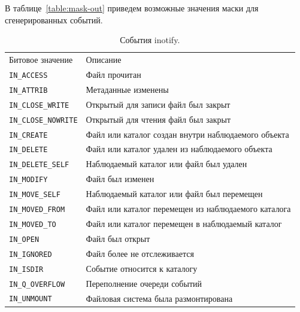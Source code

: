 \documentclass[14pt, russian]{scrartcl}
\newcommand{\code}[1]{\texttt{#1}}
\begin{document}
В таблице~\ref{table:mask-out} приведем возможные значения маски для
сгенерированных событий.

\begin{table}[htb]
  \caption{\centering События inotify.}
  \small
  \centering\begin{tabular}{|l|l|}
              \hline\hline
              \multirow{ 2}{*}{Битовое значение} & \multirow{ 2}{*}{Описание}\\
                                                 & \\
              \hline
              \code{IN\_ACCESS} & Файл прочитан\\
              \hline
              \code{IN\_ATTRIB} & Метаданные изменены\\
              \hline
              \code{IN\_CLOSE\_WRITE} & Открытый для записи файл был закрыт \\
              \hline
              \code{IN\_CLOSE\_NOWRITE} & Открытый для чтения файл был закрыт \\
              \hline
              \code{IN\_CREATE} & Файл или каталог создан внутри наблюдаемого объекта \\
              \hline
              \code{IN\_DELETE} & Файл или каталог удален из наблюдаемого объекта \\
              \hline
              \code{IN\_DELETE\_SELF} & Наблюдаемый каталог или файл был удален \\
              \hline
              \code{IN\_MODIFY} & Файл был изменен \\
              \hline
              \code{IN\_MOVE\_SELF} & Наблюдаемый каталог или файл был перемещен \\
              \hline
              \code{IN\_MOVED\_FROM} & Файл или каталог перемещен из наблюдаемого каталога \\
              \hline
              \code{IN\_MOVED\_TO} & Файл или каталог перемещен в наблюдаемый каталог \\
              \hline
              \code{IN\_OPEN} & Файл был открыт \\
              \hline
              \code{IN\_IGNORED} & Файл более не отслеживается\\
              \hline
              \code{IN\_ISDIR} & Событие относится к каталогу\\
              \hline
              \code{IN\_Q\_OVERFLOW} & Переполнение очереди событий\\
              \hline
              \code{IN\_UNMOUNT} & Файловая система была размонтирована\\
              \hline\hline
            \end{tabular}
            \label{table:mask-in}
\end{table}
\end{document}
